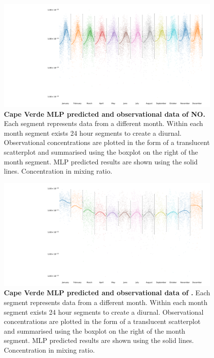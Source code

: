 \begin{figure}[H]
     \centering
         \includegraphics[width=.90\textheight,angle =90,trim={8cm 0 0 0}]{figures_c3/mlpregressor/CVNOX_CapeVerde/NO.pdf}
        \caption{\textbf{Cape Verde MLP predicted and observational data of NO.} Each segment represents data from a different month. Within each month segment exists 24 hour segments to create a diurnal. Observational concentrations are plotted in the form of a translucent scatterplot and summarised using the boxplot on the right of the month segment. MLP predicted results are shown using the solid lines. Concentration in mixing ratio.}
        \label{fig:mlpno}
\end{figure}

\begin{figure}[H]
     \centering
         \includegraphics[width=.90\textheight,angle =90,trim={8cm 0 0 0}]{figures_c3/mlpregressor/CVNOX_CapeVerde/NO2.pdf}
        \caption{\textbf{Cape Verde MLP predicted and observational data of .} Each segment represents data from a different month. Within each month segment exists 24 hour segments to create a diurnal. Observational concentrations are plotted in the form of a translucent scatterplot and summarised using the boxplot on the right of the month segment. MLP predicted results are shown using the solid lines. Concentration in mixing ratio.}
        \label{fig:mlpno2}
\end{figure}

